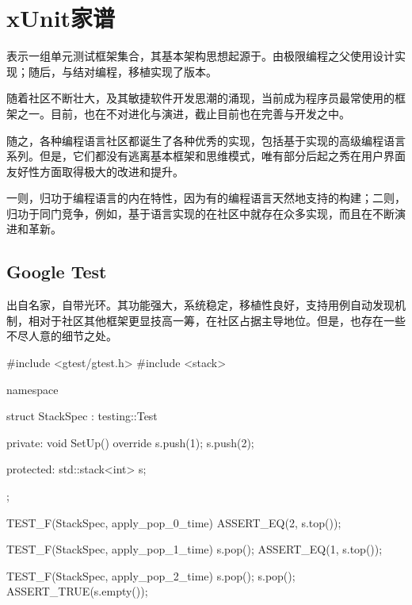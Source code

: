\section{xUnit家谱}

\begin{content}

表示一组单元测试框架集合，其基本架构思想起源于。由极限编程之父使用设计实现；随后，与结对编程，移植实现了版本。

随着社区不断壮大，及其敏捷软件开发思潮的涌现，当前成为程序员最常使用的框架之一。目前，也在不对进化与演进，截止目前也在完善与开发之中。

随之，各种编程语言社区都诞生了各种优秀的实现，包括基于实现的高级编程语言系列。但是，它们都没有逃离基本框架和思维模式，唯有部分后起之秀在用户界面友好性方面取得极大的改进和提升。

一则，归功于编程语言的内在特性，因为有的编程语言天然地支持的构建；二则，归功于同门竞争，例如，基于\cpp{}语言实现的在社区中就存在众多实现，而且在不断演进和革新。

\subsection{Google Test}

出自名家，自带光环。其功能强大，系统稳定，移植性良好，支持用例自动发现机制，相对于社区其他框架更显技高一筹，在社区占据主导地位。但是，也存在一些不尽人意的细节之处。

\begin{leftbar}
 \begin{c++}
#include <gtest/gtest.h>
#include <stack>

namespace {
  struct StackSpec : testing::Test {
  private:
    void SetUp() override {
      s.push(1);
      s.push(2);
    }

  protected:
    std::stack<int> s;
  };
}

TEST_F(StackSpec, apply_pop_0_time) {
  ASSERT_EQ(2, s.top());
}

TEST_F(StackSpec, apply_pop_1_time) {
  s.pop();
  ASSERT_EQ(1, s.top());
}

TEST_F(StackSpec, apply_pop_2_time) {
  s.pop();
  s.pop();
  ASSERT_TRUE(s.empty());
}
 \end{c++}
\end{leftbar}


\end{content}
